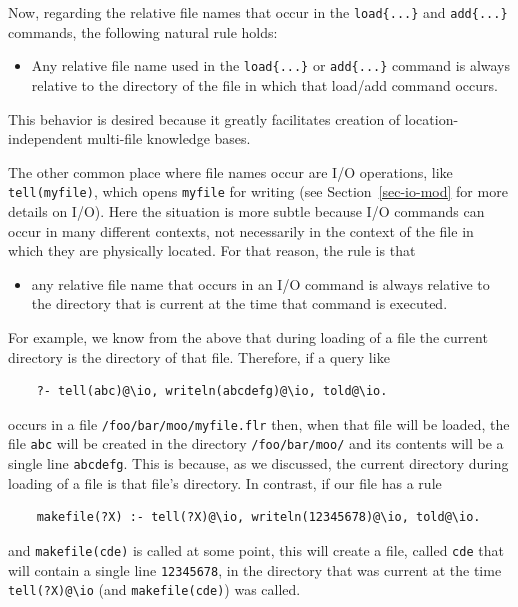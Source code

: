 \documentclass[11pt]{article}
\newcommand{\bs}{\textbackslash}
\begin{document}
Now, regarding the relative file names
that occur in the \texttt{load\{...\}} and \texttt{add\{...\}} commands,
the following natural rule holds:
\begin{itemize}
\item  Any relative file name used in the \texttt{load\{...\}} or
  \texttt{add\{...\}} command is always relative to the directory of the
  file in which that load/add command occurs.  
\end{itemize}
This behavior is desired because it greatly facilitates creation of
location-independent multi-file knowledge bases.

The other common place where file names occur are I/O
operations, like \texttt{tell(myfile)}, which opens \texttt{myfile} for
writing (see Section~\ref{sec-io-mod} for more details on I/O).  
Here the situation is more subtle because I/O commands can occur in
many different contexts, not necessarily in the context of the file in
which they are physically located. For that reason,
the rule is that
\begin{itemize}
\item  any relative file name that occurs in an I/O command is always
  relative to the directory that is current at the time that command is
  executed.
\end{itemize}
For example, we know from the above that during loading of a file the
current directory is the directory of that file. Therefore, if a query like
\begin{verbatim}
    ?- tell(abc)@\io, writeln(abcdefg)@\io, told@\io.
\end{verbatim}
occurs in a file \texttt{/foo/bar/moo/myfile.flr} then, when that file will
be loaded, the file
\texttt{abc} will be created in the directory
\texttt{/foo/bar/moo/} and its contents will be a single line \texttt{abcdefg}. 
This is because, as we discussed, the current directory during loading of a
file is that file's directory.
In contrast, if our file has a rule
\begin{verbatim}
    makefile(?X) :- tell(?X)@\io, writeln(12345678)@\io, told@\io.
\end{verbatim}
and \texttt{makefile(cde)} is called at some point, this will create a
file, called \texttt{cde} that will contain a single line   \texttt{12345678},
in the directory that was current at the time \texttt{tell(?X)@\bs{}io} (and
\texttt{makefile(cde)}) was called. 
\end{document}
